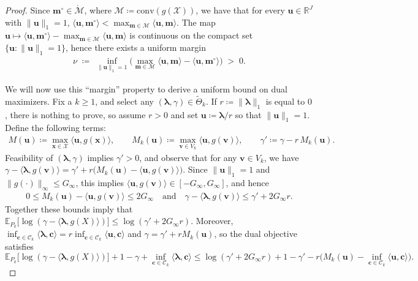\documentclass{article}
\theoremstyle{plain}
\theoremstyle{definition}
\newcommand{\R}{\mathbb{R}}
\newcommand{\calC}{\mathcal C}
\newcommand{\calX}{\mathcal X}
\newcommand{\calM}{\mathcal M}
\newcommand{\cvec}{\mathbf{c}}
\newcommand{\mvec}{\mathbf{m}}
\newcommand{\uvec}{\mathbf{u}}
\newcommand{\vvec}{\mathbf{v}}
\newcommand{\xvec}{\mathbf{x}}
\newcommand{\boldlambda}{\boldsymbol{\lambda}}
\begin{document}
\begin{proof}
Since $\mvec^{\circ}\in \mathring{\calM}$, where $\calM\coloneqq \mathrm{conv}(g(\calX))$, we have that for every $\uvec \in \R^J$ with $\|\uvec\|_1=1$, $\langle \uvec,\mvec^{\circ}\rangle < \max_{\mvec\in \calM}\langle \uvec,\mvec\rangle$.
The map $\uvec\mapsto \langle \uvec,\mvec^{\circ}\rangle-\max_{\mvec\in \calM}\langle \uvec,\mvec\rangle$ is continuous on the compact
set $\{\uvec:\|\uvec\|_1=1\}$, hence there exists a uniform margin
\begin{align}
\nu \;\coloneqq \;\inf_{\|\uvec\|_1=1}\Big(\max_{\mvec\in \calM}\langle \uvec,\mvec\rangle-\langle \uvec,\mvec^{\circ}\rangle\Big)\;>\;0.
\end{align}

We will now use this ``margin'' property to derive a uniform bound on dual maximizers. Fix a $k\ge 1$, and select any
$(\boldlambda,\gamma)\in \widetilde\Theta_k$. If $r\coloneqq \|\boldlambda\|_1$ is equal to $0$, there is nothing to prove, so assume $r>0$ and set
$\uvec\coloneqq \boldlambda/r$ so that $\|\uvec\|_1=1$. Define the following terms:
\begin{align}
M(\uvec)\coloneqq \max_{\xvec\in\calX}\langle \uvec,g(\xvec)\rangle, \qquad M_k(\uvec)\coloneqq \max_{\vvec\in V_k}\langle \uvec,g(\vvec)\rangle, \qquad \gamma'\coloneqq \gamma-r\,M_k(\uvec).
\end{align}
Feasibility of $(\boldlambda,\gamma)$ implies $\gamma'>0$, and observe that for any $\vvec\in V_k$, we have  $\gamma-\langle \boldlambda,g(\vvec)\rangle
=\gamma' + r\big(M_k(\uvec)-\langle \uvec,g(\vvec)\rangle\big)$.
Since $\|\uvec\|_1=1$ and $\|g(\cdot)\|_\infty\le G_\infty$, this implies $\langle \uvec,g(\vvec)\rangle\in[-G_\infty,G_\infty]$, and hence
\begin{align}
0\le M_k(\uvec)-\langle \uvec,g(\vvec)\rangle\le 2G_\infty \quad\text{and}\quad \gamma-\langle \boldlambda,g(\vvec)\rangle\le \gamma'+2G_\infty r.
\end{align}
Together these bounds imply that $ \mathbb E_{P_k}\!\big[\log(\gamma-\langle \boldlambda,g(X)\rangle)\big]\le \log(\gamma'+2G_\infty r)$. 
Moreover, $\inf_{\cvec\in\calC_k}\langle \boldlambda,\cvec\rangle=r\inf_{\cvec\in\calC_k}\langle \uvec,\cvec\rangle$ and
$\gamma=\gamma'+rM_k(\uvec)$, so the dual objective satisfies
\[
\mathbb E_{P_k}\!\big[\log(\gamma-\langle \boldlambda,g(X)\rangle)\big] + 1-\gamma + \inf_{\cvec\in\calC_k}\langle \boldlambda,\cvec\rangle
\le
\log(\gamma'+2G_\infty r) + 1-\gamma' - r\Big(M_k(\uvec)-\inf_{\cvec\in\calC_k}\langle \uvec,\cvec\rangle\Big).
\label{eq:KL-general-proof-1}
\]


\end{proof}
\end{document}
